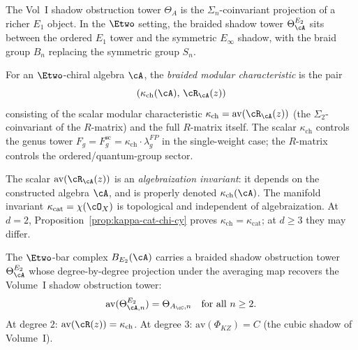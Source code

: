 The Vol~I shadow obstruction tower $\Theta_A$ is the $\Sigma_n$-coinvariant
projection of a richer $E_1$ object. In the $\Etwo$ setting, the braided
shadow tower $\Theta^{E_2}_\cA$ sits between the ordered $E_1$ tower and
the symmetric $E_\infty$ shadow, with the braid group $B_n$ replacing
the symmetric group $S_n$.

\begin{definition}
\label{def:braided-kappa}
For an $\Etwo$-chiral algebra $\cA$, the \emph{braided modular
characteristic} is the pair
\[
 (\kappa_{\mathrm{ch}}(\cA), \, \cR_\cA(z))
\]
consisting of the scalar modular characteristic
$\kappa_{\mathrm{ch}} = \mathrm{av}(\cR_\cA(z))$ (the
$\Sigma_2$-coinvariant of the $R$-matrix) and the full
$R$-matrix itself. The scalar $\kappa_{\mathrm{ch}}$ controls
the genus tower
$F_g=F_g^{\mathrm{sc}}=\kappa_{\mathrm{ch}} \cdot \lambda_g^{FP}$ in the single-weight case;
the $R$-matrix controls the ordered/quantum-group sector.
\end{definition}

\begin{remark}
\label{rem:braided-kappa-cat-vs-ch}
The scalar $\mathrm{av}(\cR_\cA(z))$ is an \emph{algebraization invariant}:
it depends on the constructed algebra $\cA$, and is properly denoted
$\kappa_{\mathrm{ch}}(\cA)$. The manifold invariant
$\kappa_{\mathrm{cat}} = \chi(\cO_X)$ is topological and independent of
algebraization. At $d = 2$, Proposition~\ref{prop:kappa-cat-chi-cy}
proves $\kappa_{\mathrm{ch}} = \kappa_{\mathrm{cat}}$; at $d \ge 3$ they
may differ.
\end{remark}

\begin{proposition}
\label{prop:braided-shadow}
The $\Etwo$-bar complex $B_{E_2}(\cA)$ carries a braided shadow
obstruction tower $\Theta^{E_2}_\cA$ whose degree-by-degree
projection under the averaging map recovers the Volume~I
shadow obstruction tower:
\[
 \mathrm{av}(\Theta^{E_2}_{\cA, n})
 = \Theta_{A_\cC, n}
 \quad \text{for all $n \geq 2$.}
\]
At degree $2$: $\mathrm{av}(\cR(z)) = \kappa_{\mathrm{ch}}$.
At degree $3$: $\mathrm{av}(\Phi_{KZ}) = C$ (the cubic shadow of
Volume~I).
\end{proposition}


